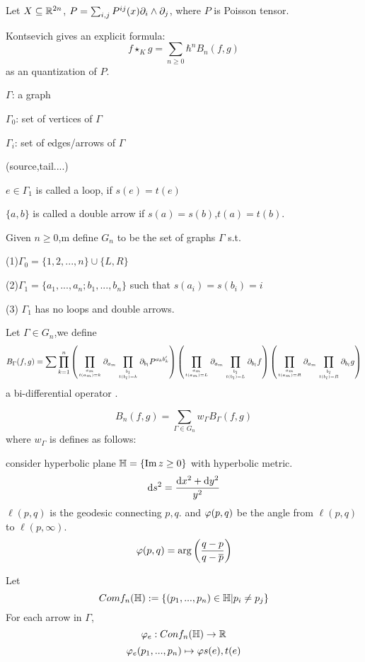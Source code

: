 Let $X\subseteq\mathbb{R}^{2n}$, $P=\sum_{i,j}P^{ij}(x)\partial_i\wedge\partial_j$,
where $P$ is Poisson tensor.

Kontsevich gives an explicit formula:
$$f\star_K g=\sum_{n\geq 0}\hbar^n B_n(f,g)$$
as an quantization of $P$.

$\Gamma$: a graph

$\Gamma_0$: set of vertices of $\Gamma$

$\Gamma_i$: set of edges/arrows of $\Gamma$

(source,tail....)

$e\in\Gamma_1$ is called a loop, if $s(e)=t(e)$

$\{a,b\}$ is called a double arrow if $s(a)=s(b)$,$t(a)=t(b)$.


Given $n\geq 0$,m define $G_n$ to be the
set of graphs $\Gamma$ s.t.

(1)$\Gamma_0=\{1,2,...,n\}\cup\{L,R\}$

(2)$\Gamma_1=\{a_1,...,a_n;b_1,...,b_n\}$
such that $s(a_i)=s(b_i)=i$

(3) $\Gamma_1$ has no loops and double arrows.

\begin{definition}
Let $\Gamma\in G_n$,we define
$$B_{\Gamma}(f,g)=
    \sum
      \prod_{k=1}^n
      \left(
        \prod_{a_m\atop t(a_m)=k}
          \partial_{a_m}
        \prod_{b_l\atop t(b_l)=k}
          \partial_{b_l}
        P^{a_kb_k'}
      \right)
      \left(
        \prod_{a_m\atop t(a_m)=L}
          \partial_{a_m}
        \prod_{b_l\atop t(b_l)=L}
          \partial_{b_l}
        f
      \right)
      \left(
        \prod_{a_m\atop t(a_m)=R}
          \partial_{a_m}
        \prod_{b_l\atop t(b_l)=R}
          \partial_{b_l}
        g
      \right)
$$
a bi-differential operator .
\end{definition}


\begin{definition}
$$B_n(f,g)=\sum_{\Gamma\in G_n}w_{\Gamma}B_{\Gamma}(f,g)$$
where $w_{\Gamma}$ is defines as follows:

consider hyperbolic plane $\mathbb{H}=\{\operatorname{Im} z\geq 0\}$ with hyperbolic metric.
$$\mathrm{d} s^2=\frac{\mathrm{d} x^2+\mathrm{d} y^2}{y^2}$$
$\ell(p,q)$ is the geodesic connecting $p,q$. and $\varphi(p,q)$
be the angle from $\ell(p,q)$ to $\ell(p,\infty)$.
$$\varphi(p,q)=\arg\left(\frac{q-p}{q-\overline{p}}\right)$$

Let
$$Comf_n(\mathbb{H}):=\{(p_1,...,p_n)\in\mathbb{H}|p_i\neq p_j\}$$
For each arrow in $\Gamma$,
$$\varphi_e:Conf_n(\mathbb{H})\to\mathbb{R}$$
$$\varphi_e(p_1,...,p_n)\mapsto
\varphi{s(e),t(e)}$$
\end{definition}


